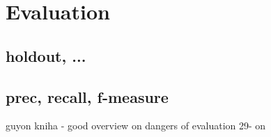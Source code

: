 \chapter{Evaluation}
\label{chap:eval}

\section{holdout, ...}

\section{prec, recall, f-measure}

guyon kniha - good overview on dangers of evaluation 29- on
